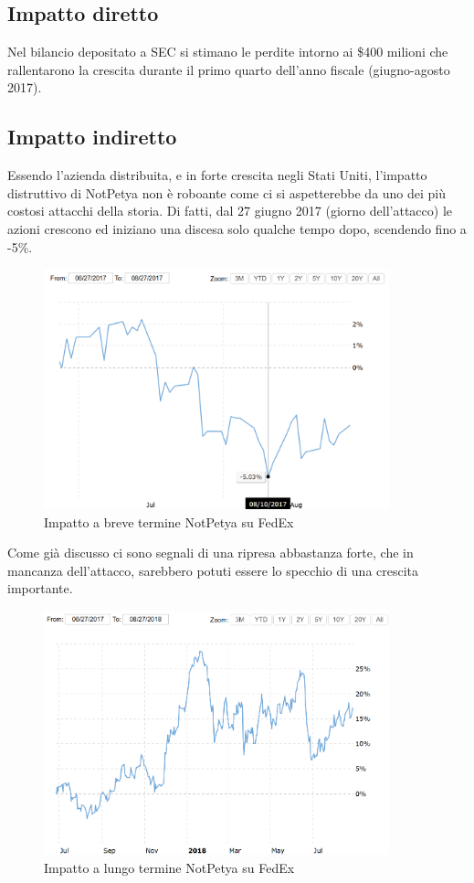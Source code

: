 \documentclass[12pt,a4paper,openright,twoside]{report}
\begin{document}
\subsection{Impatto diretto}
Nel bilancio depositato a SEC si stimano le perdite intorno ai \$400 milioni che rallentarono la crescita durante il primo quarto dell'anno fiscale (giugno-agosto 2017).\\
\subsection{Impatto indiretto}
Essendo l'azienda distribuita, e in forte crescita negli Stati Uniti, l'impatto distruttivo di NotPetya non \`e roboante come ci si aspetterebbe da uno dei pi\`u costosi attacchi della storia. Di fatti, dal 27 giugno 2017 (giorno dell'attacco) le azioni crescono ed iniziano una discesa solo qualche tempo dopo, scendendo fino a -5\%.\\
\begin{figure}[H] 
\begin{center} 
\includegraphics[width=10cm]{figures/fedex_short.png} 
\caption[Grafico FedEx NotPetya short]{Impatto a breve termine NotPetya su FedEx}\label{fig:fdx1}
\end{center}
\end{figure}

Come gi\`a discusso ci sono segnali di una ripresa abbastanza forte, che in mancanza dell'attacco, sarebbero potuti essere lo specchio di una crescita importante.

\begin{figure}[H] 
\begin{center} 
\includegraphics[width=10cm]{figures/fedex_long.png} 
\caption[Grafico FedEx NotPetya long]{Impatto a lungo termine NotPetya su FedEx}\label{fig:fdx2}
\end{center}
\end{figure}
\end{document}

